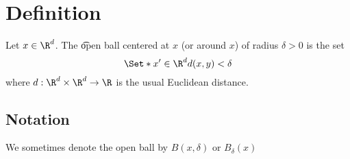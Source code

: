 
\section*{Definition}

Let $x \in \R ^d$.
The \t{open ball} centered at $x$ (or around $x$) of radius $\delta  > 0$ is the set
  \[
\Set*{x' \in \R ^{d}}{d(x, y) < \delta }
  \]
where $d: \R ^d \times \R ^d \to \R $ is the usual Euclidean distance.

\subsection*{Notation}

We sometimes denote the open ball by $B(x,\delta )$ or $B_{\delta }(x)$

\blankpage